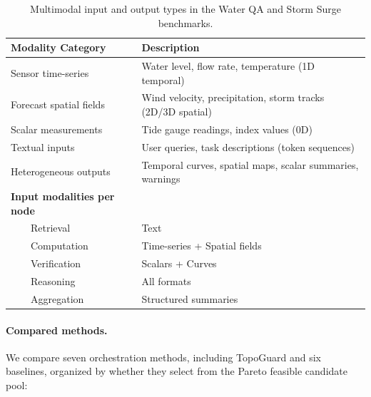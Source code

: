 \documentclass[manuscript,review,anonymous]{acmart}
\begin{document}
\begin{table}[t]
\centering
\caption{Multimodal input and output types in the Water QA and Storm Surge benchmarks.}
\label{tab:multimodal_stats}
\small
\begin{tabular}{ll}
\toprule
\textbf{Modality Category} & \textbf{Description} \\
\midrule
Sensor time-series & Water level, flow rate, temperature (1D temporal) \\
Forecast spatial fields & Wind velocity, precipitation, storm tracks (2D/3D spatial) \\
Scalar measurements & Tide gauge readings, index values (0D) \\
Textual inputs & User queries, task descriptions (token sequences) \\
Heterogeneous outputs & Temporal curves, spatial maps, scalar summaries, warnings \\
\midrule
\textbf{Input modalities per node} & \\
~~~~Retrieval & Text \\
~~~~Computation & Time-series + Spatial fields \\
~~~~Verification & Scalars + Curves \\
~~~~Reasoning & All formats \\
~~~~Aggregation & Structured summaries \\
\bottomrule
\end{tabular}
\end{table}

\paragraph{Compared methods.}
We compare seven orchestration methods, including TopoGuard and six baselines, organized by whether they select from the Pareto feasible candidate pool:
\end{document}
